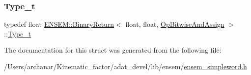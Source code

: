 \mbox{\label{structENSEM_1_1BinaryReturn_3_01float_00_01float_00_01OpBitwiseAndAssign_01_4_ad1e9a8f181e2615bea9ad008a77badf5}} 
\subsubsection{\texorpdfstring{Type\_t}{Type\_t}\hspace{0.1cm}{\footnotesize\ttfamily [2/2]}}
{\footnotesize\ttfamily typedef float \mbox{\hyperlink{structENSEM_1_1BinaryReturn}{E\+N\+S\+E\+M\+::\+Binary\+Return}}$<$ float, float, \mbox{\hyperlink{structENSEM_1_1OpBitwiseAndAssign}{Op\+Bitwise\+And\+Assign}} $>$\+::\mbox{\hyperlink{structENSEM_1_1BinaryReturn_3_01float_00_01float_00_01OpBitwiseAndAssign_01_4_ad1e9a8f181e2615bea9ad008a77badf5}{Type\+\_\+t}}}



The documentation for this struct was generated from the following file\+:\begin{DoxyCompactItemize}
\item 
/\+Users/archanar/\+Kinematic\+\_\+factor/adat\+\_\+devel/lib/ensem/\mbox{\hyperlink{lib_2ensem_2ensem__simpleword_8h}{ensem\+\_\+simpleword.\+h}}\end{DoxyCompactItemize}
